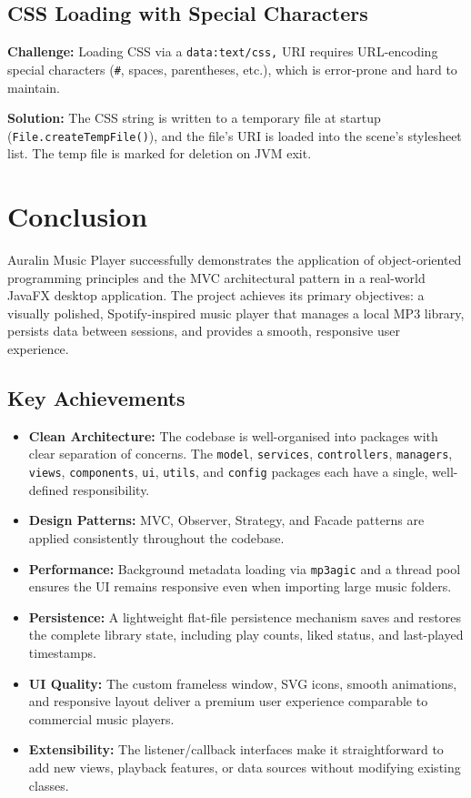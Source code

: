 ﻿\documentclass[12pt]{report}
\begin{document}
\section{CSS Loading with Special Characters}
\textbf{Challenge:} Loading CSS via a \texttt{data:text/css,} URI requires URL-encoding special characters (\texttt{\#}, spaces, parentheses, etc.), which is error-prone and hard to maintain.

\textbf{Solution:} The CSS string is written to a temporary file at startup (\texttt{File.createTempFile()}), and the file's URI is loaded into the scene's stylesheet list. The temp file is marked for deletion on JVM exit.


\newpage
\chapter{Conclusion}

Auralin Music Player successfully demonstrates the application of object-oriented programming principles and the MVC architectural pattern in a real-world JavaFX desktop application. The project achieves its primary objectives: a visually polished, Spotify-inspired music player that manages a local MP3 library, persists data between sessions, and provides a smooth, responsive user experience.

\section{Key Achievements}
\begin{itemize}
    \item \textbf{Clean Architecture:} The codebase is well-organised into packages with clear separation of concerns. The \texttt{model}, \texttt{services}, \texttt{controllers}, \texttt{managers}, \texttt{views}, \texttt{components}, \texttt{ui}, \texttt{utils}, and \texttt{config} packages each have a single, well-defined responsibility.
    \item \textbf{Design Patterns:} MVC, Observer, Strategy, and Facade patterns are applied consistently throughout the codebase.
    \item \textbf{Performance:} Background metadata loading via \texttt{mp3agic} and a thread pool ensures the UI remains responsive even when importing large music folders.
    \item \textbf{Persistence:} A lightweight flat-file persistence mechanism saves and restores the complete library state, including play counts, liked status, and last-played timestamps.
    \item \textbf{UI Quality:} The custom frameless window, SVG icons, smooth animations, and responsive layout deliver a premium user experience comparable to commercial music players.
    \item \textbf{Extensibility:} The listener/callback interfaces make it straightforward to add new views, playback features, or data sources without modifying existing classes.
\end{itemize}
\end{document}
